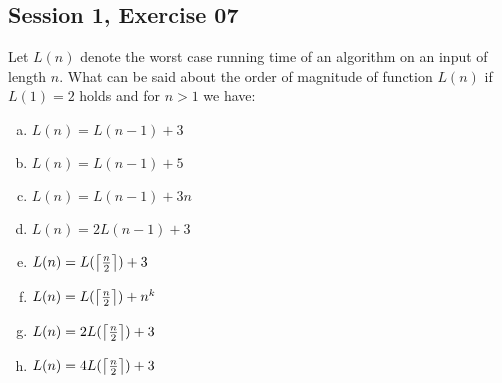 \subsection{Session 1, Exercise 07}


Let $L(n)$ denote the worst case running time of an algorithm on an input of length $n$. What can be said about the order of magnitude of function $L(n)$ if $L(1) = 2$ holds and for $n>1$ we have:

\begin{enumerate}[a.)]
    \item $L(n) = L(n-1) + 3$
    \item $L(n) = L(n-1) + 5$
    \item $L(n) = L(n-1) + 3n$
    \item $L(n) = 2L(n-1) + 3$
    \item $L(n) = L(\ceil*{\frac{n}{2}}) + 3$
    \item $L(n) = L(\ceil*{\frac{n}{2}}) + n^k$
    \item $L(n) = 2L(\ceil*{\frac{n}{2}}) + 3$
    \item $L(n) = 4L(\ceil*{\frac{n}{2}}) + 3$
\end{enumerate}

